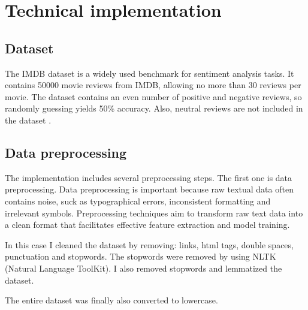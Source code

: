 \documentclass{article}
\begin{document}
\section{Technical implementation}

\subsection{Dataset}

The IMDB dataset is a widely used benchmark for sentiment analysis tasks.
It contains 50000 movie reviews from IMDB, allowing no more than 30 reviews per movie.
The dataset contains an even number of positive and negative reviews, so randomly guessing yields 50\% accuracy.
Also, neutral reviews are not included in the dataset \cite{imdb_dataset_stanfordnlp}.

\subsection{Data preprocessing}

The implementation includes several preprocessing steps.
The first one is data preprocessing.
Data preprocessing is important because raw textual data often contains noise, suck as typographical errors, inconsistent formatting and irrelevant symbols.
Preprocessing techniques aim to transform raw text data into a clean format that facilitates effective feature extraction and model training.


In this case I cleaned the dataset by removing: links, html tags, double spaces, punctuation and stopwords.
The stopwords were removed by using NLTK (Natural Language ToolKit).
I also removed stopwords and lemmatized the dataset.

The entire dataset was finally also converted to lowercase.
\end{document}
